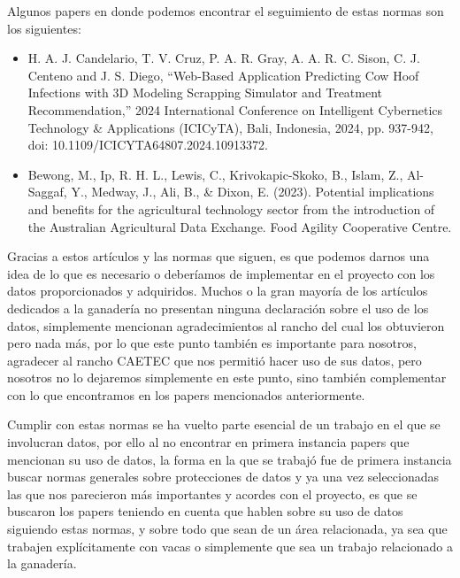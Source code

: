 Algunos papers en donde podemos encontrar el seguimiento de estas normas son los siguientes:

\begin{itemize}
  \item H. A. J. Candelario, T. V. Cruz, P. A. R. Gray, A. A. R. C. Sison, C. J. Centeno and J. S. Diego, “Web-Based Application Predicting Cow Hoof Infections with 3D Modeling Scrapping Simulator and Treatment Recommendation,” 2024 International Conference on Intelligent Cybernetics Technology \& Applications (ICICyTA), Bali, Indonesia, 2024, pp. 937-942, doi: 10.1109/ICICYTA64807.2024.10913372.
  \item Bewong, M., Ip, R. H. L., Lewis, C., Krivokapic-Skoko, B., Islam, Z., Al-Saggaf, Y., Medway, J., Ali, B., \& Dixon, E. (2023). Potential implications and benefits for the agricultural technology sector from the introduction of the Australian Agricultural Data Exchange. Food Agility Cooperative Centre.
\end{itemize}

Gracias a estos artículos y las normas que siguen, es que podemos darnos una idea de lo que es necesario o deberíamos de implementar en el proyecto con los datos proporcionados y adquiridos. Muchos o la gran mayoría de los artículos dedicados a la ganadería no presentan ninguna declaración sobre el uso de los datos, simplemente mencionan agradecimientos al rancho del cual los obtuvieron pero nada más, por lo que este punto también es importante para nosotros, agradecer al rancho CAETEC que nos permitió hacer uso de sus datos, pero nosotros no lo dejaremos simplemente en este punto, sino también complementar con lo que encontramos en los papers mencionados anteriormente.

Cumplir con estas normas se ha vuelto parte esencial de un trabajo en el que se involucran datos, por ello al no encontrar en primera instancia papers que mencionan su uso de datos, la forma en la que se trabajó fue de primera instancia buscar normas generales sobre protecciones de datos y ya una vez seleccionadas las que nos parecieron más importantes y acordes con el proyecto, es que se buscaron los papers teniendo en cuenta que hablen sobre su uso de datos siguiendo estas normas, y sobre todo que sean de un área relacionada, ya sea que trabajen explícitamente con vacas o simplemente que sea un trabajo relacionado a la ganadería.

